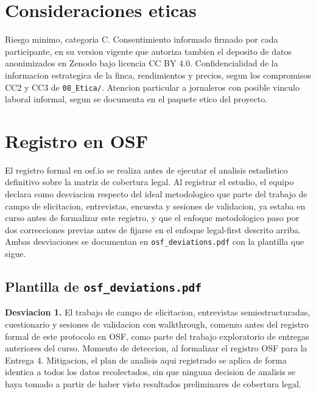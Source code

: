 \documentclass[11pt,a4paper]{article}
\begin{document}
\section{Consideraciones eticas}

Riesgo minimo, categoria C. Consentimiento informado firmado por cada participante, en su version vigente que autoriza tambien el deposito de datos anonimizados en Zenodo bajo licencia CC BY 4.0. Confidencialidad de la informacion estrategica de la finca, rendimientos y precios, segun los compromisos CC2 y CC3 de \texttt{08\_Etica/}. Atencion particular a jornaleros con posible vinculo laboral informal, segun se documenta en el paquete etico del proyecto.

\section{Registro en OSF}

El registro formal en osf.io se realiza antes de ejecutar el analisis estadistico definitivo sobre la matriz de cobertura legal. Al registrar el estudio, el equipo declara como desviacion respecto del ideal metodologico que parte del trabajo de campo de elicitacion, entrevistas, encuesta y sesiones de validacion, ya estaba en curso antes de formalizar este registro, y que el enfoque metodologico paso por dos correcciones previas antes de fijarse en el enfoque legal-first descrito arriba. Ambas desviaciones se documentan en \texttt{osf\_deviations.pdf} con la plantilla que sigue.

\subsection*{Plantilla de \texttt{osf\_deviations.pdf}}

\textbf{Desviacion 1.} El trabajo de campo de elicitacion, entrevistas semiestructuradas, cuestionario y sesiones de validacion con walkthrough, comenzo antes del registro formal de este protocolo en OSF, como parte del trabajo exploratorio de entregas anteriores del curso. Momento de deteccion, al formalizar el registro OSF para la Entrega 4. Mitigacion, el plan de analisis aqui registrado se aplica de forma identica a todos los datos recolectados, sin que ninguna decision de analisis se haya tomado a partir de haber visto resultados preliminares de cobertura legal.
\end{document}
